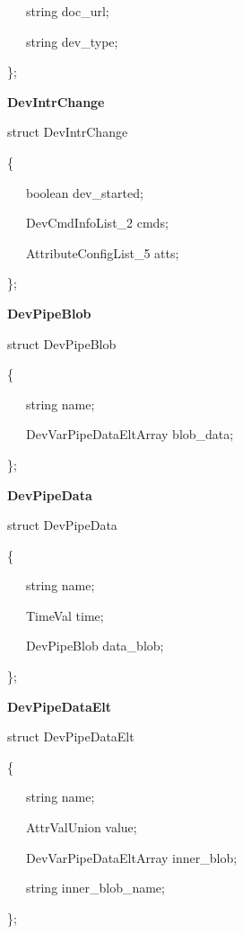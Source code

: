 ~~~string doc\_url;

~~~string dev\_type;

\};\\

\begin{flushleft}
\textbf{DevIntrChange}
\par\end{flushleft}

struct DevIntrChange

\{

~~~boolean dev\_started;

~~~DevCmdInfoList\_2 cmds;

~~~AttributeConfigList\_5 atts;

\};\\

\begin{flushleft}
\textbf{DevPipeBlob}
\par\end{flushleft}

struct DevPipeBlob

\{

~~~string name;

~~~DevVarPipeDataEltArray blob\_data;

\};\\

\begin{flushleft}
\textbf{DevPipeData}
\par\end{flushleft}

struct DevPipeData

\{

~~~string name;

~~~TimeVal time;

~~~DevPipeBlob data\_blob;

\};\\

\begin{flushleft}
\textbf{DevPipeDataElt}
\par\end{flushleft}

struct DevPipeDataElt

\{

~~~string name;

~~~AttrValUnion value;

~~~DevVarPipeDataEltArray inner\_blob;

~~~string inner\_blob\_name;

\};\\

